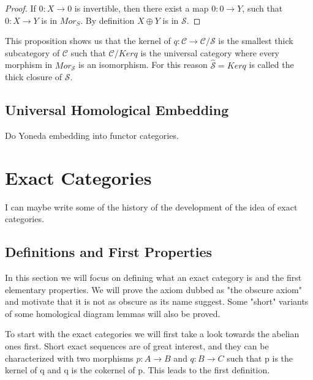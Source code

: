 \documentclass[12pt]{article}
\theoremstyle{definition}
\theoremstyle{remark}
\begin{document}
            \begin{proof}
                If $0:X\rightarrow 0$ is invertible, then there exist a map $0:0\rightarrow Y$, such that $0:X\rightarrow Y$ is in $Mor_S$. By definition $X\oplus Y$ is in $\mathcal{S}$.
            \end{proof}

            This proposition shows us that the kernel of $q:\mathcal{C}\rightarrow\mathcal{C}/\mathcal{S}$ is the smallest thick subcategory of $\mathcal{C}$ such that $\mathcal{C}/Kerq$ is the universal category where every morphism in $Mor_\mathcal{S}$ is an isomorphism. For this reason $\widehat{\mathcal{S}}=Kerq$ is called the thick closure of $\mathcal{S}$.

        \subsection{Universal Homological Embedding}
            Do Yoneda embedding into functor categories.
    
    \clearpage
    
    \section{Exact Categories}
            
        I can maybe write some of the history of the development of the idea of exact categories. 

        \subsection{Definitions and First Properties}

            In this section we will focus on defining what an exact category is and the first elementary properties. We will prove the axiom dubbed as "the obscure axiom" and motivate that it is not as obscure as its name suggest. Some "short" variants of some homological diagram lemmas will also be proved.

            To start with the exact categories we will first take a look towards the abelian ones first. Short exact sequences are of great interest, and they can be characterized with two morphisms $p:A\rightarrow B$ and $q:B\rightarrow C$ such that p is the kernel of q and q is the cokernel of p. This leads to the first definition.
\end{document}
